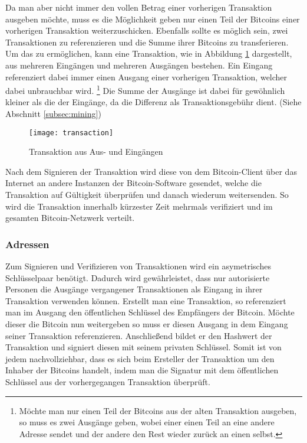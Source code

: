 Da man aber nicht immer den vollen Betrag einer vorherigen Transaktion ausgeben möchte, muss es die Möglichkeit geben nur einen Teil der Bitcoins einer vorherigen Transaktion weiterzuschicken.
Ebenfalls sollte es möglich sein, zwei Transaktionen zu referenzieren und die Summe ihrer Bitcoins zu transferieren.
Um das zu ermöglichen, kann eine Transaktion, wie in Abbildung \ref{fig:transaction} dargestellt, aus mehreren Eingängen und mehreren Ausgängen bestehen.
Ein Eingang referenziert dabei immer einen Ausgang einer vorherigen Transaktion, welcher dabei unbrauchbar wird.%
\footnote{Möchte man nur einen Teil der Bitcoins aus der alten Transaktion ausgeben, so muss es zwei Ausgänge geben, wobei einer einen Teil an eine andere Adresse sendet und der andere den Rest wieder zurück an einen selbst.}
Die Summe der Ausgänge ist dabei für gewöhnlich kleiner als die der Eingänge, da die Differenz als Transaktionsgebühr dient. (Siehe Abschnitt \ref{subsec:mining})

\begin{figure}[t]
    \begin{center}
        \texttt{[image: transaction]}
        \caption{Transaktion aus Aus- und Eingängen \parencite[5]{nakamoto}}
        \label{fig:transaction}
    \end{center}
\end{figure}

Nach dem Signieren der Transaktion wird diese von dem Bitcoin-Client über das Internet an andere Instanzen der Bitcoin-Software gesendet, welche die Transaktion auf Gültigkeit überprüfen und danach wiederum weitersenden.
So wird die Transaktion innerhalb kürzester Zeit mehrmals verifiziert und im gesamten Bitcoin-Netzwerk verteilt.

\subsubsection{Adressen}

Zum Signieren und Verifizieren von Transaktionen wird ein asymetrisches Schlüsselpaar benötigt.
Dadurch wird gewährleistet, dass nur autorisierte Personen die Ausgänge vergangener Transaktionen als Eingang in ihrer Transaktion verwenden können.
Erstellt man eine Transaktion, so referenziert man im Ausgang den öffentlichen Schlüssel des Empfängers der Bitcoin.
Möchte dieser die Bitcoin nun weitergeben so muss er diesen Ausgang in dem Eingang seiner Transaktion referenzieren.
Anschließend bildet er den Hashwert der Transaktion und signiert diesen mit seinem privaten Schlüssel.
Somit ist von jedem nachvollziehbar, dass es sich beim Ersteller der Transaktion um den Inhaber der Bitcoins handelt, indem man die Signatur mit dem öffentlichen Schlüssel aus der vorhergegangen Transaktion überprüft.

